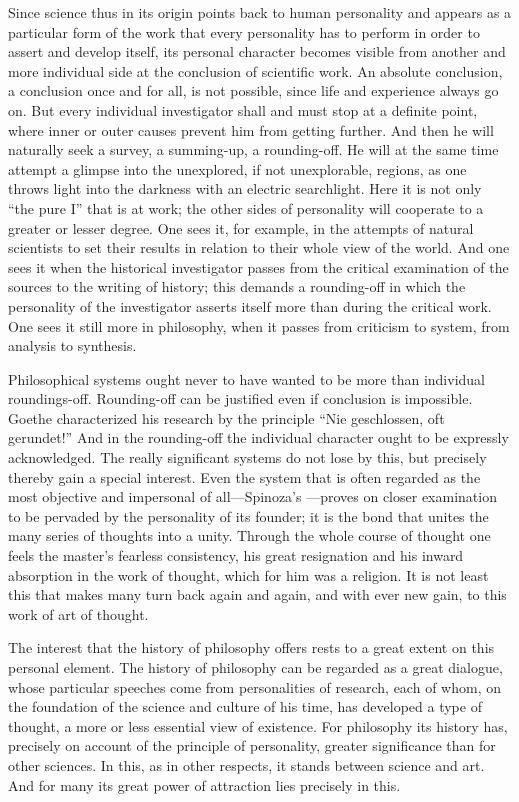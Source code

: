 \documentclass[12pt]{article}
\newcommand{\opage}[1]{\marginnote{\footnotesize\textit{[#1]}}}
\begin{document}
Since science thus in its origin points back to human personality and appears as
a particular form of the work that every personality has to perform in order to
assert and develop itself, its personal character becomes visible from another
and more individual side at the conclusion of scientific work. An absolute
conclusion, a conclusion once and for all, is not possible, since life and
experience always go on. But every individual investigator shall and must stop
at a definite point, where inner or outer causes prevent him from getting
further. And then he will naturally seek a survey, a
\opage{16}%
summing-up, a rounding-off. He will at the same time attempt a glimpse into the
unexplored, if not unexplorable, regions, as one throws light into the darkness
with an electric searchlight. Here it is not only ``the pure I'' that is at
work; the other sides of personality will cooperate to a greater or lesser
degree. One sees it, for example, in the attempts of natural scientists to set
their results in relation to their whole view of the world. And one sees it when
the historical investigator passes from the critical examination of the sources
to the writing of history; this demands a rounding-off in which the personality
of the investigator asserts itself more than during the critical work. One sees
it still more in philosophy, when it passes from criticism to system, from
analysis to synthesis.

Philosophical systems ought never to have wanted to be more than individual
roundings-off. Rounding-off can be justified even if conclusion is impossible.
Goethe characterized his research by the principle ``Nie geschlossen, oft
gerundet!'' And in the rounding-off the individual character ought to be
expressly acknowledged. The really significant systems do not lose by this, but
precisely thereby gain a special interest. Even the system
\opage{17}%
that is often regarded as the most objective and impersonal of all---Spinoza's
---proves on closer examination to be pervaded by the personality of its founder;
it is the bond that unites the many series of thoughts into a unity. Through the
whole course of thought one feels the master's fearless consistency, his great
resignation and his inward absorption in the work of thought, which for him was
a religion. It is not least this that makes many turn back again and again, and
with ever new gain, to this work of art of thought.

The interest that the history of philosophy offers rests to a great extent on
this personal element. The history of philosophy can be regarded as a great
dialogue, whose particular speeches come from personalities of research, each of
whom, on the foundation of the science and culture of his time, has developed a
type of thought, a more or less essential view of existence. For philosophy its
history has, precisely on account of the principle of personality, greater
significance than for other sciences. In this, as in other respects, it stands
between science and art. And for many its great power of attraction lies
precisely in this.
\end{document}
